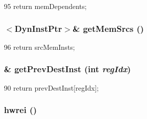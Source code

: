 \begin{DoxyCode}
95 { return memDependents; }
\end{DoxyCode}
\hypertarget{classOzoneDynInst_aabdb1fb2845bfb247663b02f8d684c3e}{
\subsubsection[{getMemSrcs}]{$<${\bf DynInstPtr}$>$\& getMemSrcs ()}}
\label{classOzoneDynInst_aabdb1fb2845bfb247663b02f8d684c3e}



\begin{DoxyCode}
96 { return srcMemInsts; }
\end{DoxyCode}
\hypertarget{classOzoneDynInst_ada8a08e554bca2a63067ff5350f49b6c}{
\subsubsection[{getPrevDestInst}]{\& getPrevDestInst (int {\em regIdx})}}
\label{classOzoneDynInst_ada8a08e554bca2a63067ff5350f49b6c}



\begin{DoxyCode}
90     { return prevDestInst[regIdx]; }
\end{DoxyCode}
\hypertarget{classOzoneDynInst_a5f42e07ae335dff417664e91518c7f1e}{
\subsubsection[{hwrei}]{ hwrei ()}}
\label{classOzoneDynInst_a5f42e07ae335dff417664e91518c7f1e}



